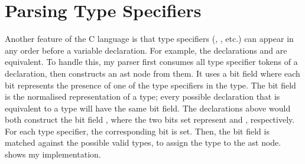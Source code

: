 \documentclass[../00-main.tex]{subfiles}
\begin{document}
\FloatBarrier %

\section{Parsing Type Specifiers}\label{app:sec:parsing type specifiers}

Another feature of the C language is that type specifiers (, , etc.) can appear in any order before a variable declaration.
For example, the declarations  and  are equivalent.
To handle this, my parser first consumes all type specifier tokens of a declaration, then constructs an  \gls{ast} node from them.
It uses a bit field where each bit represents the presence of one of the type specifiers in the type.
The bit field is the normalised representation of a type; every possible declaration that is equivalent to a type will have the same bit field.
The declarations above would both construct the bit field , where the two bits set represent  and , respectively.
For each type specifier, the corresponding bit is set.
Then, the bit field is matched against the possible valid types, to assign the type to the \gls{ast} node.
 shows my implementation.
\end{document}
